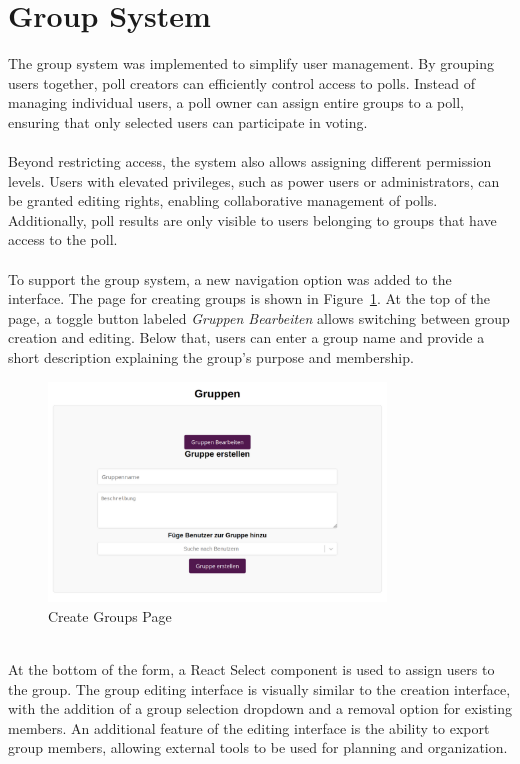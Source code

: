 \documentclass[a4paper,12pt]{report}
\begin{document}
\section{Group System}
The group system was implemented to simplify user management. By grouping users together, poll creators can efficiently control access to polls. Instead of managing individual users, a poll owner can assign entire groups to a poll, ensuring that only selected users can participate in voting. \\\\
Beyond restricting access, the system also allows assigning different permission levels. Users with elevated privileges, such as power users or administrators, can be granted editing rights, enabling collaborative management of polls. Additionally, poll results are only visible to users belonging to groups that have access to the poll. \\\\
To support the group system, a new navigation option was added to the interface. The page for creating groups is shown in Figure~\ref{fig:create_groups}. At the top of the page, a toggle button labeled \textit{Gruppen Bearbeiten} allows switching between group creation and editing. Below that, users can enter a group name and provide a short description explaining the group's purpose and membership.
\begin{figure}[H]
	\centering
	\includegraphics[width=0.8\textwidth]{pics/create_groups.png}
	\caption{Create Groups Page}
	\label{fig:create_groups}
\end{figure}
\noindent \\
At the bottom of the form, a React Select component is used to assign users to the group. The group editing interface is visually similar to the creation interface, with the addition of a group selection dropdown and a removal option for existing members. An additional feature of the editing interface is the ability to export group members, allowing external tools to be used for planning and organization. \\
\end{document}

